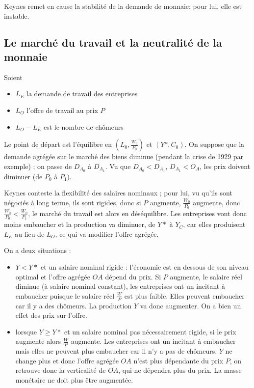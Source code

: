 	Keynes remet en cause la stabilité de la demande de monnaie:  pour lui, elle est instable.
	
	\subsection{Le marché du travail et la neutralité de la monnaie}
	
	
	
	
	Soient
	
	\begin{itemize}
		\item $L_E$ la demande de travail des entreprises
		\item $L_O$ l'offre de travail au prix $P$
		\item $L_O - L_E$ est le nombre de chômeurs
	\end{itemize}
	
	Le point de départ est l'équilibre en $(L_0, \frac{W_0}{P_0})$ et $(Y*, C_0)$. On suppose que la demande agrégée sur le marché des biens diminue (pendant la crise de 1929 par exemple) ; on passe de $D_{A_0}$ à $D_{A_1}$.  Vu que $D_{A_0} < D_{A_1}$, $D_{A_1} < O_A$, les prix doivent diminuer (de $P_0$ à $P_1$).
	
	Keynes conteste la flexibilité des salaires nominaux ; pour lui, vu qu'ils sont négociés à long terme, ils sont rigides, donc si $P$ augmente, $\frac{W_0}{P_0}$ augmente, donc $\frac{W_0}{P_0} <\frac{W_0}{P_1}$, le marché du travail est alors en déséquilibre. Les entreprises vont donc moins embaucher et la production va diminuer, de $Y*$ à $Y_C$, car elles produisent $L_E$ au lieu de $L_O$, ce qui va modifier l'offre agrégée.
	
	On a deux situations :
	
	\begin{itemize}
		\item $Y < Y*$ et un salaire nominal rigide : l'économie est en dessous de son niveau optimal et l'offre agrégée $OA$ dépend du prix. Si $P$ augmente, le salaire réel diminue (à salaire nominal constant), les entreprises ont un incitant à embaucher puisque le salaire réel $\frac{W}{P}$ est plus faible. Elles peuvent embaucher car il y a des chômeurs. La production $Y$ va donc augmenter. On a bien un effet des prix sur l'offre.
		
		\item lorsque $Y \geq Y*$ et un salaire nominal pas nécessairement rigide, si le prix augmente alors $\frac{W}{P}$ augmente. Les entreprises ont un incitant à embaucher mais elles ne peuvent plus embaucher car il n'y a pas de chômeurs. $Y$ ne change plus et donc l'offre agrégée $OA$ n'est plus dépendante du prix $P$, on retrouve donc la verticalité de $OA$, qui ne dépendra plus du prix. La masse monétaire ne doit plus être augmentée.
	\end{itemize}
	
